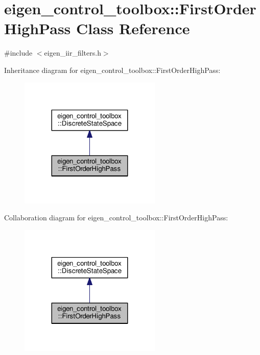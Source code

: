 \hypertarget{classeigen__control__toolbox_1_1_first_order_high_pass}{}\section{eigen\+\_\+control\+\_\+toolbox\+:\+:First\+Order\+High\+Pass Class Reference}
\label{classeigen__control__toolbox_1_1_first_order_high_pass}


{\ttfamily \#include $<$eigen\+\_\+iir\+\_\+filters.\+h$>$}



Inheritance diagram for eigen\+\_\+control\+\_\+toolbox\+:\+:First\+Order\+High\+Pass\+:
\nopagebreak
\begin{figure}[H]
\begin{center}
\leavevmode
\includegraphics[width=191pt]{classeigen__control__toolbox_1_1_first_order_high_pass__inherit__graph}
\end{center}
\end{figure}


Collaboration diagram for eigen\+\_\+control\+\_\+toolbox\+:\+:First\+Order\+High\+Pass\+:
\nopagebreak
\begin{figure}[H]
\begin{center}
\leavevmode
\includegraphics[width=191pt]{classeigen__control__toolbox_1_1_first_order_high_pass__coll__graph}
\end{center}
\end{figure}
